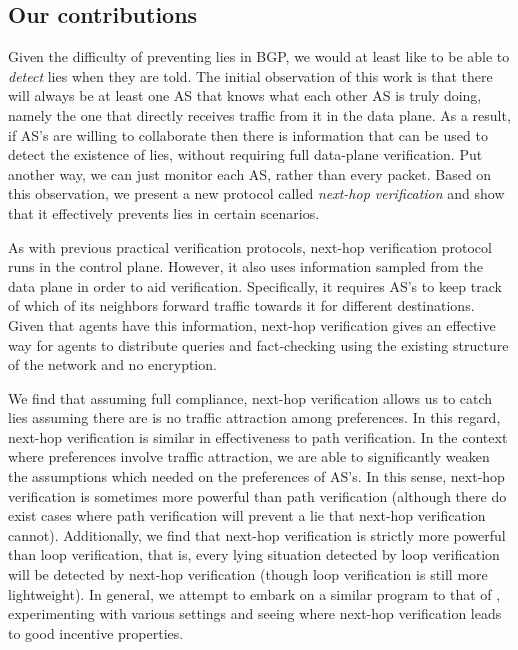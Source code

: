 \documentclass[10pt]{article}
\begin{document}
  \subsection{Our contributions}
    Given the difficulty of preventing lies in BGP,
    we would at least like to be able to \emph{detect} lies when they are told.
    The initial observation of this work is that
    there will always be at least one AS that knows what each
    other AS is truly doing, namely the one that directly receives traffic from
    it in the data plane.
    As a result, if AS's are willing to collaborate then there is
    information that can be used to detect the existence of lies, without
    requiring full data-plane verification. Put another way, we can just monitor
    each AS, rather than every packet.
    Based on this observation, we present a new protocol called
    \emph{next-hop verification}
    and show that it effectively prevents lies in certain scenarios.

    As with previous practical verification protocols,
    next-hop verification protocol runs in the control plane.
    However, it also uses
    information sampled from the data plane in order to aid verification.
    Specifically, it requires AS's to keep track of which of its neighbors
    forward traffic towards it for different destinations.
    Given that agents have this information, next-hop verification gives an
    effective way for agents to distribute queries and fact-checking
    using the existing structure of the network and no encryption.

    We find that assuming full compliance, next-hop verification allows us to catch lies assuming
    there are is no traffic attraction among preferences.
    In this regard, next-hop verification is similar in effectiveness to 
    path verification.
    In the context where preferences involve traffic attraction,
    we are able to significantly weaken the assumptions which
    \cite{Attraction} needed on the preferences of AS's.
    In this sense, next-hop verification is sometimes more powerful
    than path verification (although there do exist cases where
    path verification will prevent a lie that next-hop verification cannot).
    Additionally, we find that next-hop verification is strictly more
    powerful than loop verification, that is, every lying situation detected
    by loop verification will be detected by next-hop verification
    (though loop verification is still more lightweight).
    In general, we attempt to embark on a similar program to that of
    \cite{Attraction}, experimenting with various settings and seeing
    where next-hop verification leads to good incentive properties.
\end{document}
